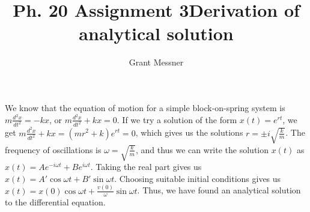 \documentclass[11pt, oneside]{article}   	%
\title{Ph. 20 Assignment 3}
\author{Grant Messner}
\begin{document}
\maketitle

\begin{section}
\title{\textbf{Derivation of analytical solution}}
\maketitle 

We know that the equation of motion for a simple block-on-spring system is $m\frac{d^2x}{dt^2} = -kx$, or $m\frac{d^2x}{dt^2} + kx = 0$. If we try a solution of the form $x(t) = e^{rt}$, we get $m\frac{d^2x}{dt^2} + kx = (mr^2 + k)e^{rt}= 0$, which gives us the solutions $r = \pm i\sqrt{\frac{k}{m}}$. The frequency of oscillations is $\omega=\sqrt{\frac{k}{m}}$, and thus we can write the solution $x(t)$ as $x(t) = Ae^{-i\omega t} + Be^{i\omega t}$. Taking the real part gives us $x(t) = A'\cos{\omega t} + B'\sin{\omega t}$. Choosing suitable initial conditions gives us $x(t) = x(0)\cos{\omega t} + \frac{v(0)}{\omega}\sin{\omega t}$. Thus, we have found an analytical solution to the differential equation.

\end{section}
\end{document}
